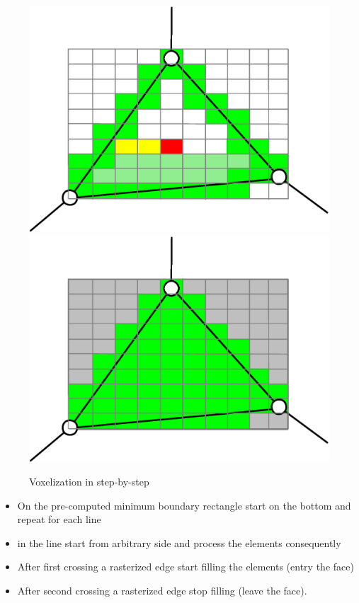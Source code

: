 \begin{figure}
\includegraphics[scale=0.25]{../img/voxelize_3.eps}
\includegraphics[scale=0.25]{../img/voxelize_4.eps}

\caption{Voxelization in step-by-step}
\label{fig:voxelize}

\end{figure}

\begin{itemize}
\item On the pre-computed minimum boundary rectangle start on the bottom and repeat for each line
\item in the line start from arbitrary side and process the elements consequently
\item After first crossing a rasterized edge start filling the elements (entry the face)
\item After second crossing a rasterized edge stop filling (leave the face).

\end{itemize}


